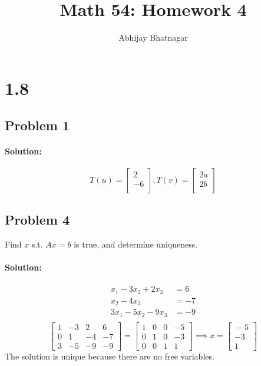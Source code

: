 \documentclass[11pt, notitlepage]{article}
\makeatletter
\newenvironment{solution}{\paragraph{Solution:}}{\hfill}
\newcommand*{\toccontents}{\@starttoc{toc}}
\makeatother
\begin{document}
   \title{Math 54: Homework 4}
   \author{Abhijay Bhatnagar}
   \maketitle
   \toccontents



\setcounter{secnumdepth}{0} %

\newpage
\section{1.8}
\subsection{Problem 1}
\begin{solution}
	\[
	T(u)=\begin{bmatrix}
		2\\
		-6 \\
	\end{bmatrix},
	T(v)=\begin{bmatrix}
		2a\\
		2b \\
	\end{bmatrix}
	\]
\end{solution}
\subsection{Problem 4}
Find $x$ s.t. $Ax=b$ is true, and determine uniqueness.
\begin{solution}
	\begin{align*}
		x_1-3x_2+2x_3&=6\\
		x_2-4x_3&=-7\\
		3x_1-5x_2-9x_3&=-9\\
	\end{align*}
	\[\begin{bmatrix}{}
	  1&-3 &2 &6 \\
	  0&1 &-4 &-7\\
	  3&-5 &-9&-9
	\end{bmatrix}=\begin{bmatrix}{}
	  1&0 &0 &-5 \\
	  0&1 &0 &-3\\
	  0&0 &1&1
	\end{bmatrix}\implies x= \begin{bmatrix}{}
	  -5 \\
	  -3\\
	  1
	\end{bmatrix}
	\]
	The solution is unique because there are no free variables.
\end{solution}
\end{document}
